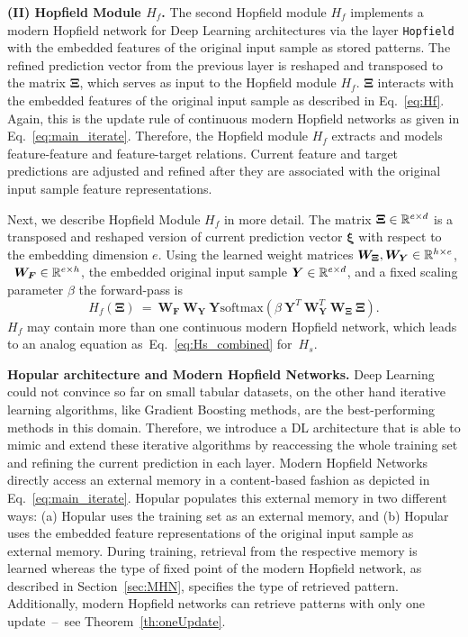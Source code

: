\documentclass{article}
\theoremstyle{plain}
\theoremstyle{definition}
\theoremstyle{remark}
\newcommand\BF{\bm{F}}
\newcommand\BW{\bm{W}}
\newcommand\BY{\bm{Y}}
\newcommand\Bxi{\bm{\xi}}
\newcommand\BXi{\bm{\Xi}}
\newcommand{\soft}{\mathrm{softmax}}
\begin{document}
{\bf (II) Hopfield Module $H_{f}$.} 
The second Hopfield module $H_{f}$ implements a modern Hopfield network for Deep Learning architectures
via the layer {\tt Hopfield} \citep{Ramsauer:21,Ramsauer:20} 
with the embedded features of the original input sample as stored patterns.
The refined prediction vector from the previous layer
is reshaped and transposed
to the matrix $\BXi$, which serves as input to
the Hopfield module $H_{f}$.
$\BXi$ interacts with the embedded features
of the original input sample
as described in Eq.~\eqref{eq:Hf}.
Again, this is the update rule of 
continuous modern Hopfield networks as given in Eq.~\eqref{eq:main_iterate}.
Therefore, the Hopfield module $H_{f}$ extracts and models
feature-feature and feature-target relations.
Current feature and target predictions are adjusted and refined after they are associated with the original input sample feature representations.

Next, we describe Hopfield Module $H_{f}$ in more detail.
The matrix $\BXi \in \dR^{e \times d}$ is a transposed and reshaped version 
of current prediction vector $\Bxi$ with respect to the embedding dimension $e$.
Using the learned weight matrices $\BW_{\BXi},\BW_{\BY} \in \dR^{h \times e}$,  \
$\BW_{\BF} \in \dR^{e \times h}$, 
the embedded original input sample $\BY \in \dR^{e \times d}$, and a fixed scaling parameter $\beta$
the forward-pass is
\begin{equation}
\label{eq:Hf}
    H_f \left(\BXi \right) \ = \ \BW_{\BF} \ \BW_{\BY} \ \BY \soft \left( \beta \ \BY^{T} \ \BW_{\BY}^{T} \ \BW_{\BXi} \ \BXi \right).
\end{equation}
$H_{f}$ may contain more than one continuous modern Hopfield network,
which leads to an analog equation as~Eq.~\eqref{eq:Hs_combined} for~$H_{s}$.

{\bf Hopular architecture and Modern Hopfield Networks.}
Deep Learning could not convince so far on small tabular datasets, 
on the other hand iterative learning algorithms, 
like Gradient Boosting methods, are the best-performing methods in this domain. 
Therefore, we introduce a DL architecture that is able to mimic and 
extend these iterative algorithms by reaccessing the whole training set and 
refining the current prediction in each layer. 
Modern Hopfield Networks directly access an external memory
in a content-based fashion as depicted in Eq.~\eqref{eq:main_iterate}.
Hopular populates this external memory in two different ways: (a) Hopular uses the training set as an external memory, and (b) Hopular uses the embedded feature representations of the original input sample as external memory.
During training, retrieval from the respective memory is learned whereas
the type of fixed point of the modern Hopfield network, 
as described in Section~\ref{sec:MHN}, specifies the type of retrieved pattern.
Additionally, modern Hopfield networks
can retrieve patterns with only one update~\---{}~see Theorem~\ref{th:oneUpdate}.
\end{document}
